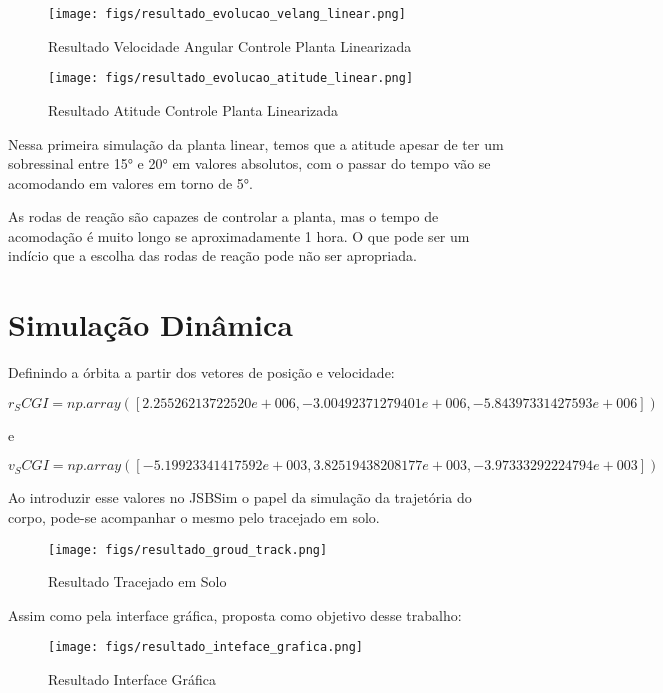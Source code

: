 \begin{figure}[htpb]
	\centering
	\texttt{[image: figs/resultado\_evolucao\_velang\_linear.png]}
	\caption{Resultado Velocidade Angular Controle Planta Linearizada}
\label{fig:15}
\end{figure}

\begin{figure}[htpb]
	\centering
	\texttt{[image: figs/resultado\_evolucao\_atitude\_linear.png]}
	\caption{Resultado Atitude Controle Planta Linearizada}
	\label{fig:15}
\end{figure}

Nessa primeira simulação da planta linear, temos que a atitude apesar de ter um sobressinal entre 15° e 20° em valores absolutos, com o passar do tempo vão se acomodando em valores em torno de 5°.

As rodas de reação são capazes de controlar a planta, mas o tempo de acomodação é muito longo se aproximadamente 1 hora. O que pode ser um indício que a escolha das rodas de reação pode não ser apropriada.

\section{Simulação Dinâmica}

Definindo a órbita a partir dos vetores de posição e velocidade:

$r_SCGI = np.array([2.25526213722520e+006, -3.00492371279401e+006, -5.84397331427593e+006])$

e

$v_SCGI = np.array([-5.19923341417592e+003, 3.82519438208177e+003, -3.97333292224794e+003])$ 


Ao introduzir esse valores no JSBSim o papel da simulação da trajetória do corpo, pode-se acompanhar o mesmo pelo tracejado em solo.

\begin{figure}[htpb]
	\centering
	\texttt{[image: figs/resultado\_groud\_track.png]}
	\caption{Resultado Tracejado em Solo}
	\label{fig:15}
\end{figure}


Assim como pela interface gráfica, proposta como objetivo desse trabalho:

\begin{figure}[htpb]
	\centering
	\texttt{[image: figs/resultado\_inteface\_grafica.png]}
	\caption{Resultado Interface Gráfica}
	\label{fig:15}
\end{figure}

